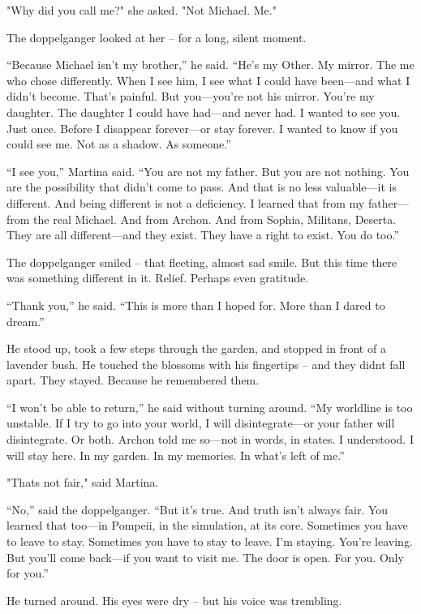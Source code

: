 \documentclass[
]{article}
\begin{document}
"Why did you call me?" she asked. "Not Michael. Me."

The doppelganger looked at her -- for a long, silent moment.

``Because Michael isn't my brother,'' he said. ``He's my Other. My mirror. The me who chose differently. When I see him, I see what I could have been---and what I didn't become. That's painful. But you---you're not his mirror. You're my daughter. The daughter I could have had---and never had. I wanted to see you. Just once. Before I disappear forever---or stay forever. I wanted to know if you could see me. Not as a shadow. As someone.''

``I see you,'' Martina said. ``You are not my father. But you are not nothing. You are the possibility that didn't come to pass. And that is no less valuable---it is different. And being different is not a deficiency. I learned that from my father---from the real Michael. And from Archon. And from Sophia, Militans, Deserta. They are all different---and they exist. They have a right to exist. You do too.''

The doppelganger smiled -- that fleeting, almost sad smile. But this time there was something different in it. Relief. Perhaps even gratitude.

``Thank you,'' he said. ``This is more than I hoped for. More than I dared to dream.''

He stood up, took a few steps through the garden, and stopped in front of a lavender bush. He touched the blossoms with his fingertips -- and they didn\textquotesingle t fall apart. They stayed. Because he remembered them.

``I won't be able to return,'' he said without turning around. ``My worldline is too unstable. If I try to go into your world, I will disintegrate---or your father will disintegrate. Or both. Archon told me so---not in words, in states. I understood. I will stay here. In my garden. In my memories. In what's left of me.''

"That\textquotesingle s not fair," said Martina.

``No,'' said the doppelganger. ``But it's true. And truth isn't always fair. You learned that too---in Pompeii, in the simulation, at its core. Sometimes you have to leave to stay. Sometimes you have to stay to leave. I'm staying. You're leaving. But you'll come back---if you want to visit me. The door is open. For you. Only for you.''

He turned around. His eyes were dry -- but his voice was trembling.
\end{document}
